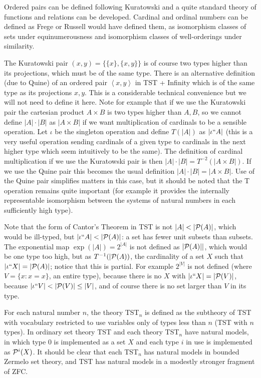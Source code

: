 \documentclass[12pt]{article}
\begin{document}
Ordered pairs can be defined following Kuratowski and a quite standard theory of functions and relations can be developed.  Cardinal and ordinal numbers can be defined as Frege or Russell would have defined them, as isomorphism classes of sets under equinumerousness and isomorphism classes of well-orderings under similarity.  

The Kuratowski pair $(x,y) = \{\{x\},\{x,y\}\}$ is of course two types higher than its projections, which must be of the same type.  There is an alternative definition (due to Quine) of an ordered pair
$\left< x,y\right>$ in TST + Infinity which is of the same type as its projections $x,y$.  This is a considerable technical convenience but we will not need to define it here.  Note for example that if we use the Kuratowski pair the cartesian product $A \times B$ is two types higher than $A,B$, so we cannot define $|A| \cdot |B|$ as $|A \times B|$ if we want multiplication of cardinals to be a sensible operation.  Let $\iota$ be the singleton operation and define $T(|A|)$ as $|\iota``A|$ (this is a very useful operation sending cardinals of a given type to cardinals in the next higher type which seem intuitively to be the same).  The definition of cardinal multiplication if we use the Kuratowski pair is then $|A| \cdot |B| =T^{-2}(|A\times B|)$.  If we use the Quine pair this becomes the usual definition $|A| \cdot |B| =|A\times B|$.  Use of the Quine pair simplifies matters in this case, but it should be noted that the T operation remains quite important (for example it provides the internally representable isomorphism between the systems of natural numbers in each sufficiently high type).

Note that the form of Cantor's Theorem in TST is not $|A| < |{\cal P}(A)|$, which would be ill-typed, but $|\iota``A|<|{\cal P}(A)|$:  a set has fewer unit subsets than subsets.  The exponential map $\exp(|A|) = 2^{|A|}$ is not defined as $|{\cal P}(A)||$, which would be one type too high, but as $T^{-1}(|{\cal P}(A))$, the cardinality of a set $X$ such that $|\iota``X| = |{\cal P}(A)|$;   notice that this is partial.  For example
$2^{|V|}$ is not defined (where $V=\{x:x=x\}$, an entire type), because there is no $X$ with $|\iota``X|=|{\cal P}(V)|$, because $|\iota``V|<|{\cal P}(V)| \leq |V|$, and of course there is no set larger than $V$ in its type.

For each natural number $n$, the theory TST$_n$ is defined as the subtheory of TST with vocabulary restricted to use variables only of types less than $n$ (TST with $n$ types).
In ordinary set theory TST and each theory TST$_n$ have natural models, in which type 0 is implemented as a set $X$ and each type $i$ in use is implemented as ${\cal P}^i(X)$.  It should be clear that each TST$_n$ has natural models in bounded Zermelo set theory, and TST has natural models in a modestly stronger fragment of ZFC.
\end{document}
